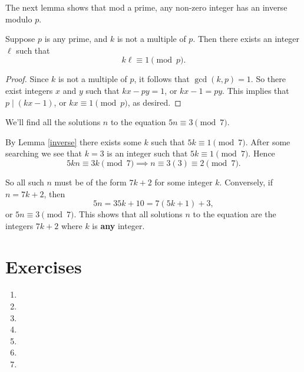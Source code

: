 The next lemma shows that mod a prime, any non-zero integer has an inverse modulo $p$.

\begin{lemma} \label{inverse}
Suppose $p$ is any prime, and $k$ is not a multiple of $p$. Then there exists an integer $\ell$ such that 
\[k \ell \equiv 1 \pmod{p}.\]
\end{lemma}

\begin{proof}
Since $k$ is not a multiple of $p$, it follows that $\gcd(k, p) = 1$. So there exist integers $x$ and $y$ such that $kx - py = 1$, or $kx - 1 = py$. This implies that $p \mid (kx - 1)$, or $kx \equiv 1 \pmod{p}$, as desired.
\end{proof}

\begin{example}
We'll find all the solutions $n$ to the equation $5n \equiv 3 \pmod{7}$.
\begin{tcolorbox}
 By Lemma \ref{inverse} there exists some $k$ such that $5k \equiv 1 \pmod{7}$. After some searching we see that $k = 3$ is an integer such that $5k \equiv 1 \pmod{7}$. Hence
 \[5kn \equiv 3k \pmod{7} \implies n \equiv 3(3) \equiv 2 \pmod{7}.\]
 
 So all such $n$ must be of the form $7k + 2$ for some integer $k$. Conversely, if $n = 7k + 2$, then 
 \[5n = 35k + 10 = 7(5k + 1) + 3,\] or $5n \equiv 3 \pmod{7}$. This shows that all solutions $n$ to the equation are the integers $7k + 2$ where $k$ is \textbf{any} integer.
\end{tcolorbox}
\end{example}

\section{Exercises}
 \begin{enumerate}
   \item 
   \item 
   \item 
   \item 
   \item 
   \item 
   \item 
 \end{enumerate}

